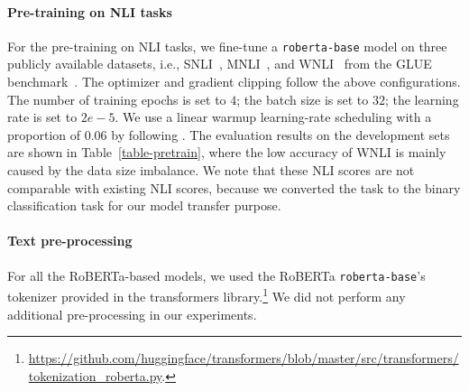 \begin{table}[t]
  \begin{center}
{\small
{}
}
    \caption{Examples used to train clasifier-BT.}
    \label{tb:bt-examples}
  \end{center}

\end{table}


\paragraph{Pre-training on NLI tasks}\label{appendix-pre-training}
For the pre-training on NLI tasks, we fine-tune a {\tt roberta-base} model on three publicly available datasets, i.e., SNLI~\citep{snli}, MNLI~\citep{mnli}, and WNLI~\citep{wnli} from the GLUE benchmark~\citep{glue}.
The optimizer and gradient clipping follow the above configurations.
The number of training epochs is set to $4$; the batch size is set to $32$; the learning rate is set to $2e-5$.
We use a linear warmup learning-rate scheduling with a proportion of $0.06$ by following \citet{roberta}.
The evaluation results on the development sets are shown in Table~\ref{table-pretrain}, where the low accuracy of WNLI is mainly caused by the data size imbalance.
We note that these NLI scores are not comparable with existing NLI scores, because we converted the task to the binary classification task for our model transfer purpose.



\paragraph{Text pre-processing}
For all the RoBERTa-based models, we used the RoBERTa {\tt roberta-base}'s tokenizer provided in the transformers library.\footnote{\url{https://github.com/huggingface/transformers/blob/master/src/transformers/tokenization_roberta.py}.}
We did not perform any additional pre-processing in our experiments.


